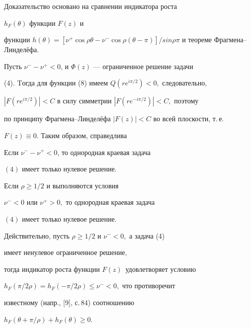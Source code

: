 Доказательство основано на сравнении индикатора роста


$h_{F}(\theta)$ функции $F(z)$ и


функции $h(\theta)=[\nu^{+}\cos\rho\theta-\nu^{-}\cos\rho(\theta-


\pi)]/sin\rho\pi$ и теореме Фрагмена--Линдел\"ефа.





Пусть $\nu^{-}-\nu^{+} < 0$, и $\Phi(z)$ --- ограниченное решение задачи


(4). Tогда для функции (8) имеем $Q(re^{i\pi/2}) < 0,$ следовательно,


$|F(re^{i\pi/2})| < C$ в силу симметрии $|F(re^{-i\pi/2})| < C,$  поэтому


по принципу Фрагмена--Линдел\"ефа $|F(z)| <C$ во всей плоскости, т.\,е.


$F(z)\equiv 0.$ Таким образом, справедлива





\begin{thm}


Если $\nu^{-}-\nu^{+}<0$, то однородная краевая задача


$(4)$ имеет только нулевое решение.


\end{thm}





\begin{thm}


Если $\rho\geq 1/2$ и выполняются условия


$\nu^{-} <0$ или $\nu^{+} >0,$ то однородная краевая задача


$(4)$ имеет только нулевое решение.


\end{thm}





Действительно, пусть $\rho\geq 1/2$ и $\nu^{-} <0,$ а задача (4)


имеет ненулевое ограниченное решение,


тогда индикатор роста функции $F(z)\,$ удовлетворяет условию


$ h_{F}(\pi/2\rho)=h_{F}(-\pi/2\rho)\leq\nu^{-} < 0,$ что противоречит


известному (напр., [9], с.\,84) соотношению


$h_{F}(\theta+\pi/\rho)+ h_{F}(\theta)\geq 0$.





